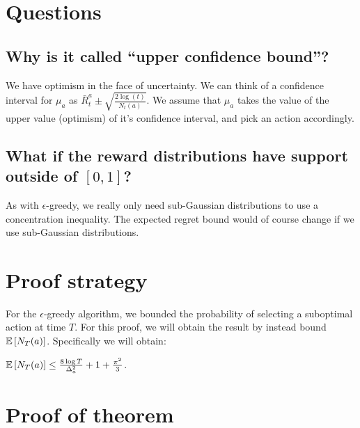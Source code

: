 \documentclass[11pt]{article}
\begin{document}
\section{Questions}

\subsection{Why is it called ``upper confidence bound''?}

We have optimism in the face of uncertainty.  We can think of a
confidence interval for $\mu_a$ as $\bar R_t^a \pm \sqrt{\frac{2\log(t)}{N_t(a)}}$.  We  assume that $\mu_a$ takes the value of the upper value (optimism)  of it's confidence interval, and pick an action accordingly.

\subsection{What if the reward distributions have support outside of $[0,1]$?}

As with $\epsilon$-greedy, we really only need sub-Gaussian
distributions to use a concentration inequality.  The expected regret
bound would of course change if we use sub-Gaussian distributions.

\section{Proof strategy}

For the $\epsilon$-greedy algorithm, we bounded the probability of
selecting a suboptimal action at time $T$.  For this proof, we will obtain the result by instead bound $\mathbb{E}\left[ N_T(a) \right]$.  Specifically we will obtain:

$\mathbb{E}\left[ N_T(a) \right] \leq \frac{8 \log T}{\Delta_a^2} + 1 + \frac{\pi^2}{3}$.

\section{Proof of theorem}
\end{document}
